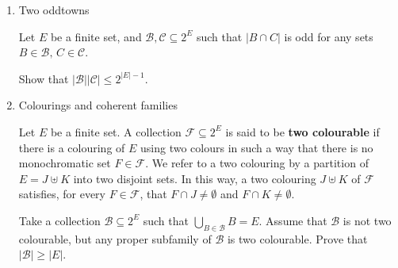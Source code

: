 \documentclass[kulak]{tplt}
\theoremstyle{definition}
\newcommand{\CC}{\mathcal C}
\newcommand{\BB}{\mathcal B}
\newcommand{\FF}{\mathcal F}
\begin{document}
\begin{enumerate}
\item Two oddtowns

Let $E$ be a finite set, and $\BB, \CC\subseteq 2^E$ such that $|B\cap C|$ is odd for any sets $B\in \BB, \, C \in \CC$.

Show that $|\BB| |\CC| \leq 2^{|E|-1}$.


\item Colourings and coherent families

Let $E$ be a finite set.
A collection $\FF \subseteq 2^E $ is said to be \textbf{two colourable} if there is a colouring of $E$ using two colours in such a way that there is no monochromatic set $F \in \FF$.
We refer to a two colouring by a partition of $E = J \uplus K$ into two disjoint sets.
In this way, a two colouring $J \uplus K$ of $\FF$ satisfies, for every $F \in \FF$, that $F\cap J \neq \emptyset $ and $ F \cap K \neq \emptyset $.

Take a collection $\BB \subseteq 2^E$ such that $\bigcup_{B \in \BB} B = E$.
Assume that $\BB$ is not two colourable, but any proper subfamily of $\BB$ is two colourable.
Prove that $|\BB| \geq |E|$.



\end{enumerate}
\end{document}
